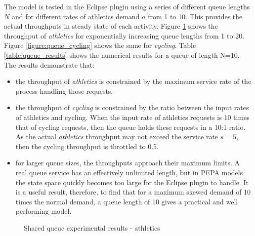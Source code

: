 \documentclass[runningheads]{llncs}
\begin{document}
\FloatBarrier
The model is tested in the Eclipse plugin using a series of different queue lengths $\mathit{N}$ and for different rates of athletics demand $\mathit{a}$ from 1 to 10.  This provides the actual throughputs in steady state of each activity.  Figure \ref{figure:queue_athletics} shows the throughput of {\itshape athletics} for exponentially increasing queue lengths from 1 to 20.  Figure \ref{figure:queue_cycling} shows the same for {\itshape cycling}.  Table \ref{table:queue_results} shows the numerical results for a queue of length N=10.
The results demonstrate that:
\begin{itemize}
	\item the throughput of {\itshape athletics} is constrained by the maximum service rate of the process handling those requests.
	\item the throughput of {\itshape cycling} is constrained by the ratio between the input rates of athletics and cycling.  When the input rate of athletics requests is 10 times that of cycling requests, then the queue holds these requests in a 10:1 ratio.  As the actual {\itshape athletics} throughput may not exceed the service rate $\mathit{s=5}$, then the cycling throughput is throttled to 0.5.
	\item for larger queue sizes, the throughputs approach their maximum limits.  A real queue service has an effectively unlimited length, but in PEPA models the state space quickly becomes too large for the Eclipse plugin to handle.  It is a useful result, therefore, to find that for a maximum skewed demand of 10 times the normal demand, a queue length of 10 gives a practical and well performing model.
\end{itemize}

\begin{figure}
	\centering
	\caption{Shared queue experimental results - athletics}
	\label{figure:queue_athletics}
\end{figure}
\end{document}
